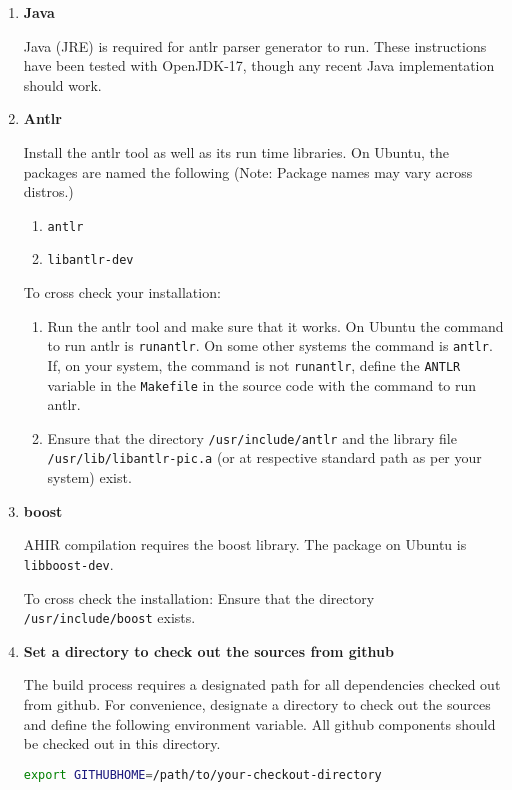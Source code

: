 \documentclass[12pt,a4paper]{article}
\begin{document}
\begin{enumerate}
\item \textbf{Java}

Java (JRE) is required for antlr parser generator to run. These instructions have been tested with OpenJDK-17, though any recent Java implementation should work.

\item \textbf{Antlr}

Install the antlr tool as well as its run time libraries. On Ubuntu, the packages are named the following (Note: Package names may vary across distros.)

\begin{enumerate}
\item \texttt{antlr}
\item \texttt{libantlr-dev}
\end{enumerate}

To cross check your installation:

\begin{enumerate}
\item Run the antlr tool and make sure that it works. On Ubuntu the command to run antlr is \texttt{runantlr}. On some other systems the command is \texttt{antlr}. If, on your system, the command is not \texttt{runantlr}, define the \texttt{ANTLR} variable in the \texttt{Makefile} in the source code with the command to run antlr.

\item Ensure that the directory \texttt{/usr/include/antlr} and the library file \texttt{/usr/lib/libantlr-pic.a} (or at respective standard path as per your system) exist.
\end{enumerate}

\item \textbf{boost}

AHIR compilation requires the boost library. The package on Ubuntu is \texttt{libboost-dev}.

To cross check the installation: Ensure that the directory \texttt{/usr/include/boost} exists.

\item \textbf{Set a directory to check out the sources from github}

The build process requires a designated path for all dependencies checked out from github. For convenience, designate a directory to check out the sources and define the following environment variable. All github components should be checked out in this directory.

\begin{lstlisting}[language=bash,style=snippet]
export GITHUBHOME=/path/to/your-checkout-directory
\end{lstlisting}


\end{enumerate}
\end{document}
